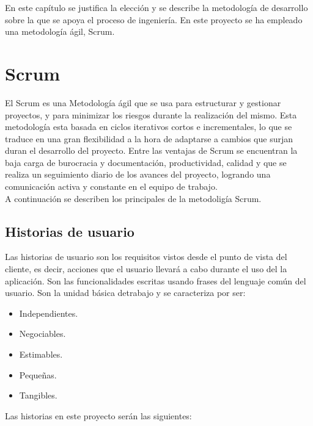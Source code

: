 En este capítulo se justifica la elección y se describe la metodología de desarrollo sobre la que se apoya el proceso de ingeniería. En este proyecto se ha empleado una metodología ágil, Scrum. 



\section{Scrum}

El Scrum es una  Metodología ágil \cite{6} \cite{9} que se usa para estructurar y gestionar proyectos, y para minimizar los riesgos durante la realización del mismo.
Esta metodología esta basada en ciclos iterativos cortos e incrementales, lo que se traduce en una gran flexibilidad a la hora de adaptarse a cambios que surjan duran el desarrollo del proyecto.
Entre las ventajas de Scrum se encuentran la baja carga de burocracia y documentación, productividad, calidad y que se realiza un seguimiento diario de los avances del proyecto, logrando una comunicación activa y constante en el equipo de trabajo.\\
A continuación se describen los principales  de la metodoligía Scrum.


\subsection{Historias de usuario}
Las historias de usuario son los requisitos vistos desde el punto de vista del cliente, es decir, acciones que el usuario llevará a cabo durante el uso del la aplicación. Son las funcionalidades escritas usando frases del lenguaje común del usuario. Son la unidad básica detrabajo y se caracteriza por ser:
\begin{itemize}
\item Independientes.
 \item Negociables.
  \item Estimables.
  \item Pequeñas.
   \item Tangibles.
    
\end{itemize}

Las historias en este proyecto serán las siguientes:


